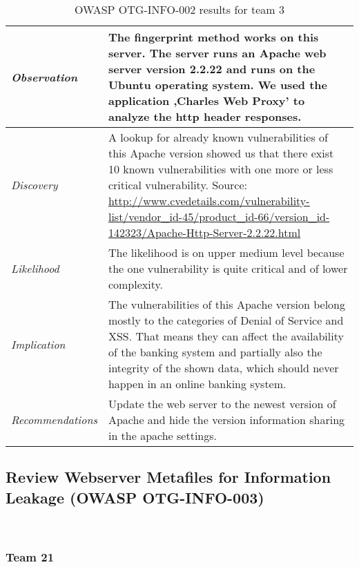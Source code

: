 \documentclass[headsepline,footsepline,footinclude=false,oneside,fontsize=11pt,paper=a4,listof=totoc,bibliography=totoc]{scrbook} %
\begin{document}
\begin{table}[H]
\centering
 \begin{tabular}{l p{11cm}} 
 \textit{Observation} & The fingerprint method works on this server. The server runs an Apache web server version 2.2.22 and runs on the Ubuntu operating system. We used the application ‚Charles Web Proxy’ to analyze the http header responses.\\ 
 \hline
 \textit{Discovery} & A lookup for already known vulnerabilities of this Apache version showed us that there exist 10 known vulnerabilities with one more or less critical vulnerability. Source: \url{http://www.cvedetails.com/vulnerability-list/vendor_id-45/product_id-66/version_id-142323/Apache-Http-Server-2.2.22.html}\\
 \hline
 \textit{Likelihood} & The likelihood is on upper medium level because the one vulnerability is quite critical and of lower complexity. \\
 \hline
 \textit{Implication} & The vulnerabilities of this Apache version belong mostly to the categories of Denial of Service and XSS. That means they can affect the availability of the banking system and partially also the integrity of the shown data, which should never happen in an online banking system.\\
 \hline
 \textit{Recommendations} & Update the web server to the newest version of Apache and hide the version information sharing in the apache settings.\\ 
\end{tabular}
\caption{OWASP OTG-INFO-002 results for team 3}
\label{table:scenario2}
\end{table}

\pagebreak 

\subsection{Review Webserver Metafiles for Information Leakage (OWASP OTG-INFO-003)}\
\pagebreak 

\subsubsection{Team 21}
\end{document}
